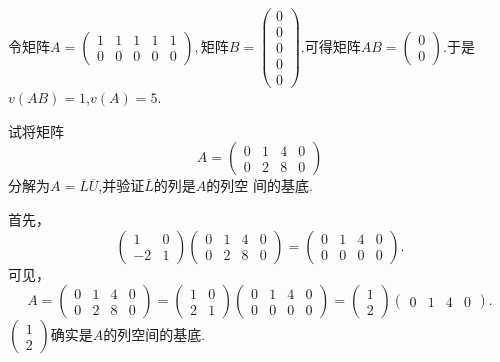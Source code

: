 ﻿\documentclass{book} \usepackage{exsheets} \usepackage{xeCJK}
\begin{document}
\begin{solution}
  令矩阵$A=
  \begin{pmatrix}
    1&1&1&1&1\\
    0&0&0&0&0
  \end{pmatrix}, $矩阵$B=
  \begin{pmatrix}
    0\\
    0\\
    0\\
    0\\
    0
  \end{pmatrix}.  $可得矩阵$AB=
  \begin{pmatrix}
    0\\
    0
  \end{pmatrix}.  $于是$v(AB)=1$,$v(A)=5$.
\end{solution}
\begin{question}
  试将矩阵
$$
A=
\begin{pmatrix}
  0&1&4&0\\
  0&2&8&0
\end{pmatrix}
$$
分解为$A=\overline{L}\overline{U}$,并验证$\overline{L}$的列是$A$的列空
间的基底.
\end{question}
\begin{solution}
  首先，
$$
\begin{pmatrix}
  1&0\\
  -2&1
\end{pmatrix}
\begin{pmatrix}
  0&1&4&0\\
  0&2&8&0
\end{pmatrix}=
\begin{pmatrix}
  0&1&4&0\\
  0&0&0&0
\end{pmatrix}.
$$
可见，
$$
A=
\begin{pmatrix}
  0&1&4&0\\
  0&2&8&0
\end{pmatrix}=
\begin{pmatrix}
  1&0\\
  2&1
\end{pmatrix}
\begin{pmatrix}
  0&1&4&0\\
  0&0&0&0
\end{pmatrix}=
\begin{pmatrix}
  1\\
  2
\end{pmatrix}
\begin{pmatrix}
  0&1&4&0
\end{pmatrix}.
$$
$
\begin{pmatrix}
  1\\
  2
\end{pmatrix}
$确实是$A$的列空间的基底.
\end{solution}
\end{document}
